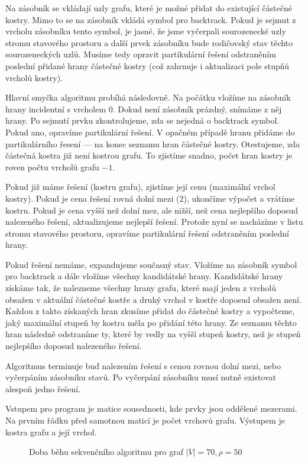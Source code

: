 \documentclass[12pt]{article}
\begin{document}
Na zásobník se vkládají uzly grafu, které je možné přidat do existující částečné kostry. Mimo to se na zásobník vkládá symbol pro backtrack. Pokud je sejmut z vrcholu zásobníku tento symbol, je jasné, že jsme vyčerpali sourozenecké uzly stromu stavového prostoru a další prvek zásobníku bude rodičovský stav těchto sourozeneckých uzlů. Musíme tedy opravit partikulární řešení odstraněním poslední přidané hrany částečné kostry (což zahrnuje i aktualizaci pole stupňů vrcholů kostry).

Hlavní smyčka algoritmu probíhá následovně. Na počátku vložíme na zásobník hrany incidentní s vrcholem 0. Dokud není zásobník prázdný, snímáme z něj hrany. Po sejmutí prvku zkontrolujeme, zda se nejedná o backtrack symbol. Pokud ano, opravíme partikulární řešení. V opačném případě hranu přidáme do partikulárního řesení --- na konec seznamu hran částečné kostry. Otestujeme, zda částečná kostra již není kostrou grafu. To zjistíme snadno, počet hran kostry je roven počtu vrcholů grafu $-1$.

Pokud již máme řešení (kostru grafu), zjistíme její cenu (maximální vrchol kostry). Pokud je cena řešení rovná dolní mezi (2), ukončíme výpočet a vrátíme kostru. Pokud je cena vyšší než dolní mez, ale nižší, než cena nejlepšího doposud nalezeného řešení, aktualizujeme nejlepší řešení. Protože nyní se nacházíme v listu stromu stavového prostoru, opravíme partikulární řešení odstraněním poslední hrany.

Pokud řešení nemáme, expandujeme současný stav. Vložíme na zásobník symbol pro backtrack a dále vložíme všechny kandidátské hrany. Kandidátské hrany získáme tak, že nalezneme všechny hrany grafu, které mají jeden z vrcholů obsažen v aktuální částečné kostře a druhý vrchol v kostře doposud obsažen není. Každou z takto získaných hran zkusíme přidat do částečné kostry a vypočteme, jaký maximální stupeň by kostra měla po přidání této hrany. Ze seznamu těchto hran následně odstraníme ty, které by vedly na vyšší stupeň kostry, než je stupeň nejlepšího doposud nalezeného řešení.

Algoritmus terminuje buď nalezením řešení s cenou rovnou dolní mezi, nebo vyčerpáním zásobníku stavů. Po vyčerpání zásobníku musí nutně existovat alespoň jedno řešení.

Vstupem pro program je matice sousednosti, kde prvky jsou oddělené mezerami. Na prvním řádku před samotnou maticí je počet vrchovů grafu. Výstupem je kostra grafu a její vrchol.

\begin{figure}[ht]
\epsfysize=10cm \centerline{} \caption{Doba běhu sekvenčního algoritmu pro graf $\vert V \vert = 70, \rho = 50$} \label{seq}
\end{figure}
\end{document}
